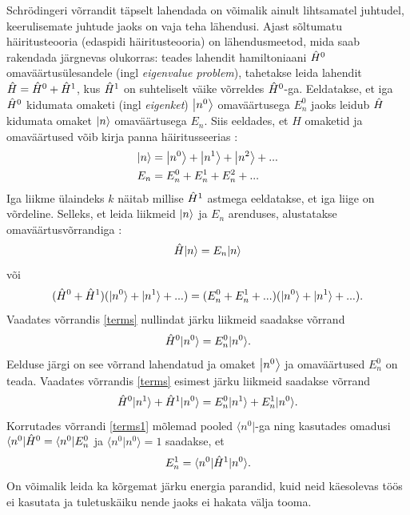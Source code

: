 \documentclass{trkut}%
\renewcommand\bra[1]{{\langle{#1}|}}
\renewcommand\ket[1]{{|{#1}\rangle}}
\renewcommand\Ket[1]{\mleft|#1\mright\rangle}
\renewcommand\braket[1]{\langle{#1}\rangle}
\begin{document}
Schrödingeri võrrandit täpselt lahendada on võimalik ainult lihtsamatel juhtudel, keerulisemate juhtude jaoks on vaja teha lähendusi.
Ajast sõltumatu häiritusteooria (edaspidi häiritusteooria) on lähendusmeetod, mida saab rakendada järgnevas olukorras: teades lahendit hamiltoniaani $\op[0]{H}$ omaväärtusülesandele (ingl \textit{eigenvalue problem}), tahetakse leida lahendit $\op{H}=\op[0]{H}+\op[1]{H}$, kus $\op[1]{H}$ on suhteliselt väike võrreldes $\op[0]{H}$-ga.
Eeldatakse, et iga $\op[0]{H}$ kidumata omaketi (ingl \textit{eigenket}) $\Ket{n^0}$ omaväärtusega $E_n^0$ jaoks leidub $\op{H}$ kidumata omaket $\Ket{n}$ omaväärtusega $E_n$.
Siis eeldades, et $H$ omaketid ja omaväärtused võib kirja panna häiritusseerias \parencite[451]{shankar94}:
\begin{align}
    \Ket{n}&=\Ket{n^0}+\Ket{n^1}+\Ket{n^2}+... \\
    E_n&=E_n^0+E_n^1+E_n^2+...
\end{align}
Iga liikme ülaindeks $k$ näitab millise $\op[1]{H}$ astmega eeldatakse, et iga liige on võrdeline.
Selleks, et leida liikmeid $\Ket{n}$ ja $E_n$ arenduses, alustatakse omaväärtusvõrrandiga \parencite[451-452]{shankar94}:
\begin{equation}
    \op{H}\ket{n}=E_n\ket{n}
\end{equation}
või
\begin{equation}
    (\op[0]{H} + \op[1]{H})(\ket{n^0}+\ket{n^1}+...)=(E_n^0+E_n^1+...) (\ket{n^0}+\ket{n^1}+...).
    \label{terms}
\end{equation}
Vaadates võrrandis \eqref{terms} nullindat järku liikmeid saadakse võrrand
\begin{equation}
    \op[0]{H}\ket{n^0}=E_n^0\ket{n^0}.
\end{equation}
Eelduse järgi on see võrrand lahendatud ja omaket $\Ket{n^0}$ ja omaväärtused $E_n^0$ on teada. Vaadates võrrandis \eqref{terms} esimest järku liikmeid saadakse võrrand
\begin{equation}
    \op[0]{H}\ket{n^1} + \op[1]{H}\ket{n^0} = E_n^0\ket{n^1} + E_n^1\ket{n^0}.
    \label{terms1}
\end{equation}
Korrutades võrrandi \eqref{terms1} mõlemad pooled $\bra{n^0}$-ga ning kasutades omadusi $\bra{n^0}\op[0]{H}=\bra{n^0}E_n^0$ ja $\braket{n^0|n^0}=1$ saadakse, et
\begin{equation}
    E_n^1=\braket{n^0|\op[1]{H}|n^0}.
    \label{parand1}
\end{equation}
On võimalik leida ka kõrgemat järku energia parandid, kuid neid käesolevas töös ei kasutata ja tuletuskäiku nende jaoks ei hakata välja tooma.
\end{document}
